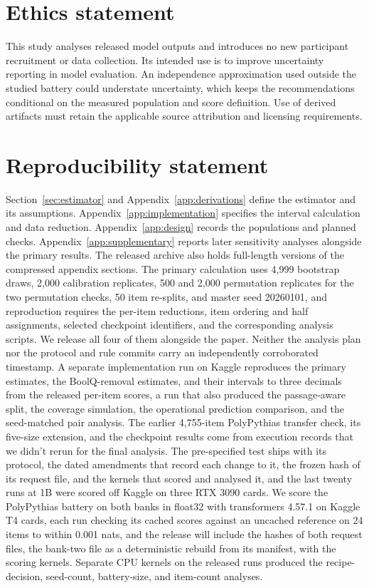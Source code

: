 \section*{Ethics statement}
This study analyses released model outputs and introduces no new participant recruitment or data collection. Its intended use is to improve uncertainty reporting in model evaluation. An independence approximation used outside the studied battery could understate uncertainty, which keeps the recommendations conditional on the measured population and score definition. Use of derived artifacts must retain the applicable source attribution and licensing requirements.

\section*{Reproducibility statement}
Section~\ref{sec:estimator} and Appendix~\ref{app:derivations} define the estimator and its assumptions. Appendix~\ref{app:implementation} specifies the interval calculation and data reduction. Appendix~\ref{app:design} records the populations and planned checks. Appendix~\ref{app:supplementary} reports later sensitivity analyses alongside the primary results. The released archive also holds full-length versions of the compressed appendix sections. The primary calculation uses 4,999 bootstrap draws, 2,000 calibration replicates, 500 and 2,000 permutation replicates for the two permutation checks, 50 item re-splits, and master seed 20260101, and reproduction requires the per-item reductions, item ordering and half assignments, selected checkpoint identifiers, and the corresponding analysis scripts. We release all four of them alongside the paper. Neither the analysis plan nor the protocol and rule commits carry an independently corroborated timestamp. A separate implementation run on Kaggle reproduces the primary estimates, the BoolQ-removal estimates, and their intervals to three decimals from the released per-item scores, a run that also produced the passage-aware split, the coverage simulation, the operational prediction comparison, and the seed-matched pair analysis. The earlier 4,755-item PolyPythias transfer check, its five-size extension, and the checkpoint results come from execution records that we didn't rerun for the final analysis. The pre-specified test ships with its protocol, the dated amendments that record each change to it, the frozen hash of its request file, and the kernels that scored and analysed it, and the last twenty runs at 1B were scored off Kaggle on three RTX 3090 cards. We score the PolyPythias battery on both banks in float32 with transformers 4.57.1 on Kaggle T4 cards, each run checking its cached scores against an uncached reference on 24 items to within 0.001 nats, and the release will include the hashes of both request files, the bank-two file as a deterministic rebuild from its manifest, with the scoring kernels. Separate CPU kernels on the released runs produced the recipe-decision, seed-count, battery-size, and item-count analyses.
